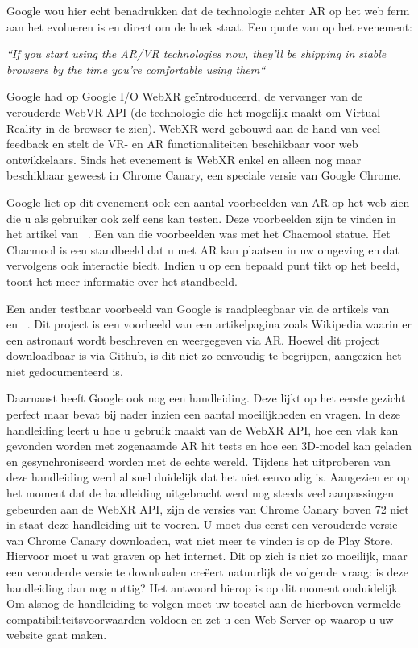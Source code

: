Google wou hier echt benadrukken dat de technologie achter AR op het web ferm aan het evolueren is en direct om de hoek staat. Een quote van op het evenement:
 
\textit{``If you start using the AR/VR technologies now, they’ll be shipping in stable browsers by the time you’re comfortable using them``}

Google had op Google I/O WebXR geïntroduceerd, de vervanger van de verouderde WebVR API (de technologie die het mogelijk maakt om Virtual Reality in de browser te zien). WebXR werd gebouwd aan de hand van veel feedback en stelt de VR- en AR functionaliteiten beschikbaar voor web ontwikkelaars. Sinds het evenement is WebXR enkel en alleen nog maar beschikbaar geweest in Chrome Canary, een speciale versie van Google Chrome.
 
Google liet op dit evenement ook een aantal voorbeelden van AR op het web zien die u als gebruiker ook zelf eens kan testen. Deze voorbeelden zijn te vinden in het artikel van ~\textcite{Medley2018}. Een van die voorbeelden was met het Chacmool statue. Het Chacmool is een standbeeld dat u met AR kan plaatsen in uw omgeving en dat vervolgens ook interactie biedt. Indien u op een bepaald punt tikt op het beeld, toont het meer informatie over het standbeeld. 

Een ander testbaar voorbeeld van Google is raadpleegbaar via de artikels van ~\textcite{Stanush2018} en ~\textcite{Ali2018}. 
Dit project is een voorbeeld van een artikelpagina zoals Wikipedia waarin er een astronaut wordt beschreven en weergegeven via AR. Hoewel dit project downloadbaar is via Github, is dit niet zo eenvoudig te begrijpen, aangezien het niet gedocumenteerd is. 
 
 Daarnaast heeft Google ook nog een handleiding. Deze lijkt op het eerste gezicht perfect maar bevat bij nader inzien een aantal moeilijkheden en vragen. 
 In deze handleiding leert u hoe u gebruik maakt van de WebXR API, hoe een vlak kan gevonden worden met zogenaamde AR hit tests en hoe een 3D-model kan geladen en gesynchroniseerd worden met de echte wereld. Tijdens het uitproberen van deze handleiding werd al snel duidelijk dat het niet eenvoudig is. Aangezien er op het moment dat de handleiding uitgebracht werd nog steeds veel aanpassingen gebeurden aan de WebXR API, zijn de versies van Chrome Canary boven 72 niet in staat deze handleiding uit te voeren. U moet dus eerst een verouderde versie van Chrome Canary downloaden, wat niet meer te vinden is op de Play Store. Hiervoor moet u wat graven op het internet. Dit op zich is niet zo moeilijk, maar een verouderde versie te downloaden creëert natuurlijk de volgende vraag: is deze handleiding dan nog nuttig? Het antwoord hierop is op dit moment onduidelijk. Om alsnog de handleiding te volgen moet uw toestel aan de hierboven vermelde compatibiliteitsvoorwaarden voldoen en zet u een Web Server op waarop u uw website gaat maken. 


